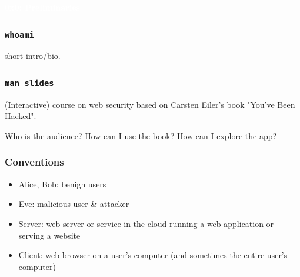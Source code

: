 \documentclass[aspectratio=169]{beamer}
\begin{document}
{
\begin{frame}
\huge{\textcolor{white}{\textbf{0x0: Preliminaries}}}
\end{frame}
}

\begin{frame}
    \frametitle{\texttt{whoami}}
    short intro/bio.
\end{frame}

\begin{frame}
    \frametitle{\texttt{man slides}}

    (Interactive) course on web security based on Carsten Eiler's book "You've Been Hacked".
    
    Who is the audience? How can I use the book? How can I explore the app?
\end{frame}

\begin{frame}
    \frametitle{Conventions}
    \begin{itemize}
        \item Alice, Bob: benign users
        \item Eve: malicious user \& attacker
        \item Server: web server or service in the cloud running a web application or serving a website
        \item Client: web browser on a user's computer (and sometimes the entire user's computer)
    \end{itemize}

\end{frame}
\end{document}
